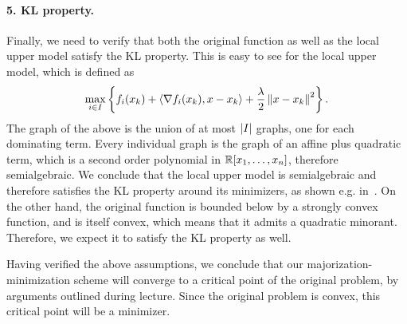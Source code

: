 \documentclass[10pt]{article}
\begin{document}
\begin{Answer}
    \paragraph{5. KL property.}
    Finally, we need to verify that both the original function as well as the
    local upper model satisfy the KL property. This is easy to see for the
    local upper model, which is defined as
    \[
        \max_{i \in I} \left\{ f_i(x_k) + \left\langle \nabla f_i(x_k), x - x_k \right\rangle
        + \frac{\lambda}{2} \left \|  x - x_k \right \|^2 \right\}.
    \]
    The graph of the above is the union of at most $\left| I \right|$ graphs, one for
    each dominating term. Every individual graph is the graph of an affine plus
    quadratic term, which is a second order polynomial in $\mathbb{R}[x_1, \dots,
    x_n]$, therefore semialgebraic. We conclude that the local upper model
    is semialgebraic and therefore satisfies the KL property around its
    minimizers, as shown e.g. in~\cite{BolDanLew07}.
    On the other hand, the original function is bounded below by a strongly
    convex function, and is itself convex, which means that it admits a
    quadratic minorant. Therefore, we expect it to satisfy the KL property as
    well.

    Having verified the above assumptions, we conclude that our
    majorization-minimization scheme will converge to a critical point of the
    original problem, by arguments outlined during lecture. Since the original
    problem is convex, this critical point will be a minimizer.
\end{Answer}
\end{document}
